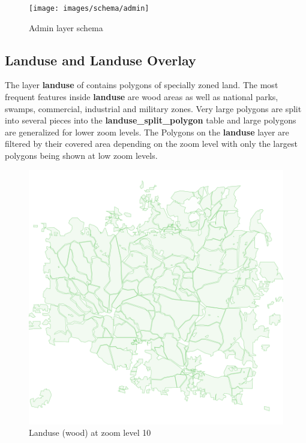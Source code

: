 \vspace{20}

\begin{figure}[H]
  \centering
  \texttt{[image: images/schema/admin]}
  \caption{Admin layer schema}
\end{figure}

\subsection{Landuse and Landuse Overlay}

\noindent\begin{minipage}[t]{0.48\linewidth}
    \vspace{0pt}
    The layer \textbf{landuse} of contains polygons of specially zoned land. The most frequent 
    features inside \textbf{landuse} are wood areas as well as national parks, swamps, commercial, industrial and military zones.
    Very large polygons are split into several pieces into the \textbf{landuse\_split\_polygon} table and large polygons are generalized
    for lower zoom levels. The Polygons on the \textbf{landuse} layer are filtered by their covered area depending on the zoom level with only
    the largest polygons being shown at low zoom levels.
\end{minipage}
\hfill
\begin{minipage}[t]{0.48\linewidth}
    \vspace{-20pt}
    \begin{figure}[H]
      \includegraphics[width=1\textwidth]{images/schema/landuse_example}
      \caption{Landuse (wood) at zoom level 10}
    \end{figure}
\end{minipage}

